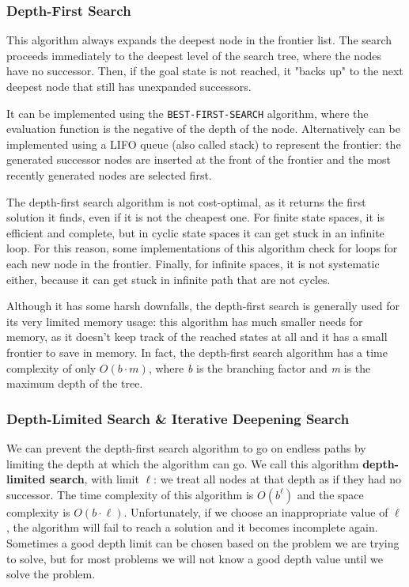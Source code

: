 \documentclass{article}
\begin{document}
\subsubsection{Depth-First Search}
This algorithm always expands the deepest node in the frontier list. The search proceeds immediately to the deepest level of the search tree, where the nodes have no successor. Then, if the goal state is not reached, it "backs up" to the next deepest node that still has unexpanded successors. 

It can be implemented using the \lstinline{BEST-FIRST-SEARCH} algorithm, where the evaluation function is the negative of the depth of the node. Alternatively can be implemented using a LIFO queue (also called stack) to represent the frontier: the generated successor nodes are inserted at the front of the frontier and the most recently generated nodes are selected first.

The depth-first search algorithm is not cost-optimal, as it returns the first solution it finds, even if it is not the cheapest one. For finite state spaces, it is efficient and complete, but in cyclic state spaces it can get stuck in an infinite loop. For this reason, some implementations of this algorithm check for loops for each new node in the frontier. Finally, for infinite spaces, it is not systematic either, because it can get stuck in infinite path that are not cycles.

Although it has some harsh downfalls, the depth-first search is generally used for its very limited memory usage: this algorithm has much smaller needs for memory, as it doesn't keep track of the reached states at all and it has a small frontier to save in memory. In fact, the depth-first search algorithm has a time complexity of only $O(b\cdot m)$, where \textit{b} is the branching factor and \textit{m} is the maximum depth of the tree.

\subsubsection{Depth-Limited Search \& Iterative Deepening Search}
We can prevent the depth-first search algorithm to go on endless paths by limiting the depth at which the algorithm can go. We call this algorithm \textbf{depth-limited search}, with limit $\ell$: we treat all nodes at that depth as if they had no successor. The time complexity of this algorithm is $O(b^\ell)$ and the space complexity is $O(b\cdot \ell)$. Unfortunately, if we choose an inappropriate value of $\ell$, the algorithm will fail to reach a solution and it becomes incomplete again. Sometimes a good depth limit can be chosen based on the problem we are trying to solve, but for most problems we will not know a good depth value until we solve the problem.
\end{document}
